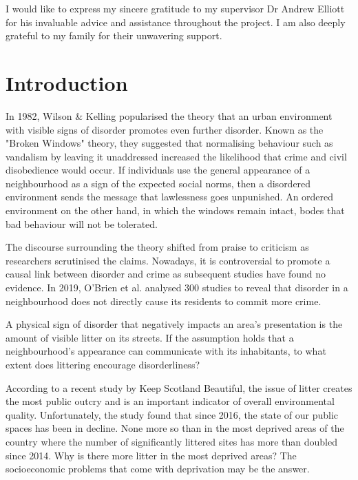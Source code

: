 \documentclass{thesis}
\begin{document}
I would like to express my sincere gratitude to my supervisor Dr Andrew Elliott for his invaluable advice and assistance throughout the project. I am also deeply grateful to my family for their unwavering support.


\listoffigures
\listoftables


\tableofcontents


\chapter{Introduction}

In 1982, Wilson \& Kelling popularised the theory that an urban environment with visible signs of disorder promotes even further disorder. Known as the "Broken Windows" theory, they suggested that normalising behaviour such as vandalism by leaving it unaddressed increased the likelihood that crime and civil disobedience would occur\cite{broken-windows}. If individuals use the  general appearance of a neighbourhood as a sign of the expected social norms, then a disordered environment sends the message that lawlessness goes unpunished. An ordered environment on the other hand, in which the windows remain intact, bodes that bad behaviour will not be tolerated.

The discourse surrounding the theory shifted from praise to criticism as researchers scrutinised the claims. Nowadays, it is controversial to promote a causal link between disorder and crime as subsequent studies have found no evidence\cite{OBrien2019LookingTB}. In 2019, O’Brien et al. analysed 300 studies to reveal that disorder in a neighbourhood does not directly cause its residents to commit more crime.

A physical sign of disorder that negatively impacts an area's presentation is the amount of visible litter on its streets. If the assumption holds that a neighbourhood's appearance can communicate with its inhabitants, to what extent does littering encourage disorderliness?

According to a recent study by Keep Scotland Beautiful, the issue of litter creates the most public outcry and is an important indicator of overall environmental quality\cite{household-survey-2019}. Unfortunately, the study found that since 2016, the state of our public spaces has been in decline. None more so than in the most deprived areas of the country where the number of significantly littered sites has more than doubled since 2014. Why is there more litter in the most deprived areas? The socioeconomic problems that come with deprivation may be the answer.
\end{document}
